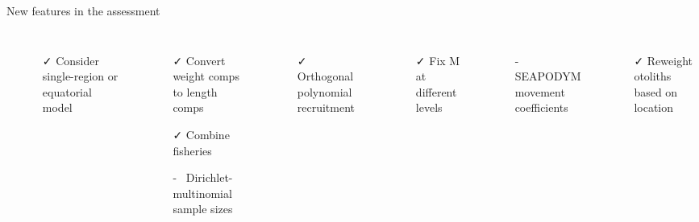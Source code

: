 \documentclass[aspectratio=169]{beamer}
\begin{document}
\begin{frame}{New features in the assessment}\fns
  \vspace{-2ex}
  \begin{columns}[T]
    \phantom{Spatial structure}\\[-0.8ex]
    \begin{itemize}\setlength\itemsep{-0.1ex}
      \item[\faCheck] {\darkgreen Consider single-region or equatorial
        model}\\[1.4ex]
    \end{itemize}
    \phantom{Fisheries}\\[-0.8ex]
    \begin{itemize}\setlength\itemsep{-0.1ex}
      \item[\faCheck] {\darkgreen Convert weight comps to length comps}
      \item[\faCheck] {\darkgreen Combine fisheries}
      \item[\gray-~] {\gray Dirichlet-multinomial sample sizes}\\[1.4ex]
    \end{itemize}
    \phantom{Recruitment}\\[-0.8ex]
    \begin{itemize}\setlength\itemsep{-0.1ex}
      \item[\faCheck] {\darkgreen Orthogonal polynomial recruitment}\\[1.4ex]
    \end{itemize}
    \phantom{Natural mortality}\\[-0.8ex]
    \begin{itemize}\setlength\itemsep{-0.1ex}
      \item[\faCheck] {\darkgreen Fix M at different levels}\\[1.4ex]
    \end{itemize}
    \phantom{Movement}\\[-0.8ex]
    \begin{itemize}\setlength\itemsep{-0.1ex}
      \item[\gray-~] {\gray SEAPODYM movement coefficients}\\[1.4ex]
    \end{itemize}
    \phantom{Growth}\\[-0.8ex]
    \begin{itemize}\setlength\itemsep{-0.1ex}
      \item[\faCheck] {\darkgreen Reweight otoliths based on location}

\end{itemize}
\end{columns}
\end{frame}
\end{document}
